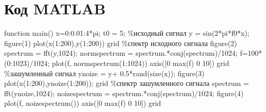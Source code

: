\documentclass[10pt,a4paper]{report}
\begin{document}
\section{Код MATLAB}
function main()\newline
x=0:0.01:4*pi;\newline
t0 = 5;\newline
\%исходный сигнал\newline
y = sin(2*pi*f0*x);\newline
figure(1)\newline
plot(x(1:200),y(1:200))\newline
grid\newline
\%спектр исходного сигнала\newline
figure(2)\newline
spectrum = fft(y,1024);\newline
normspectrum = spectrum.*conj(spectrum)/1024;\newline
f=100*(0:1023)/1024;\newline
plot(f, normspectrum(1:1024))\newline
axis([0 max(f) 0 10])\newline
grid\newline
\%зашумленный сигнал\newline
ynoize = y+ 0.5*rand(size(x));\newline
figure(3)\newline
plot(x(1:200),ynoize(1:200));\newline
grid\newline
\%спектр зашумленного сигнала\newline
spectrum = fft(ynoize,1024);\newline
noizespectrum = spectrum.*conj(spectrum)/1024;\newline
figure(4)\newline
plot(f, noizespectrum())\newline
axis([0 max(f) 0 10])\newline
grid\newline
\end{document}
